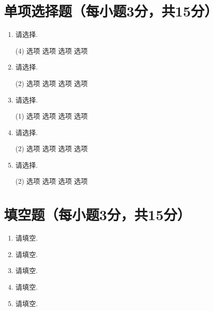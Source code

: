 \documentclass[oneside,AutoFakeBold=2.85]{cjluexam}
\begin{document}
\maketitle

\section{单项选择题（每小题3分，共15分）}

\begin{enumerate}
  \item
    请选择\Fill{4em}{}.
    \begin{tasks}(4)
      \task 选项
      \task 选项
      \task 选项
      \task 选项
    \end{tasks}
  \item
    请选择\Fill{4em}{}.
    \begin{tasks}(2)
      \task 选项
      \task 选项
      \task 选项
      \task 选项
    \end{tasks}
  \item
    请选择\Fill{4em}{}.
    \begin{tasks}(1)
      \task 选项
      \task 选项
      \task 选项
      \task 选项
    \end{tasks}
  \item
    请选择\Fill{4em}{}.
    \begin{tasks}(2)
      \task 选项
      \task 选项
      \task 选项
      \task 选项
    \end{tasks}
  \item
    请选择\Fill{4em}{}.
    \begin{tasks}(2)
      \task 选项
      \task 选项
      \task 选项
      \task 选项
    \end{tasks}
\end{enumerate}

\clearpage

\section{填空题（每小题3分，共15分）}

\begin{enumerate}
  \item
    请填空\Fill{8em}{}.
  \item
    请填空\Fill{8em}{}.
  \item
    请填空\Fill{8em}{}.
  \item
    请填空\Fill{8em}{}.
  \item
    请填空\Fill{8em}{}.
\end{enumerate}
\end{document}

